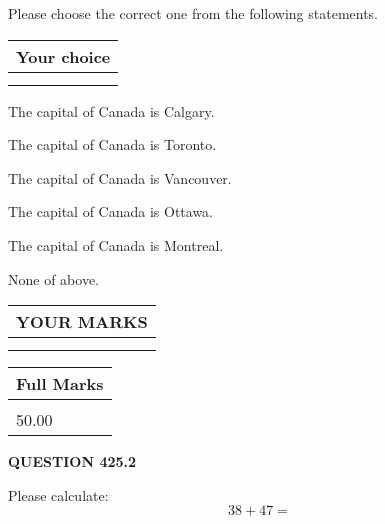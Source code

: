 \documentclass[12pt]{article}
\begin{document}
  
Please choose the correct one from the following statements.
  
  
\noindent\hspace{3.0in} \begin{tabular}{|l|}
\hline
Your choice \\
\hline
 \\ 
 \\ 
\hline
\end{tabular}
  
  
 
 
The capital of Canada is Calgary.
 
 
The capital of Canada is Toronto.
 
 
The capital of Canada is Vancouver.
 
 
The capital of Canada is Ottawa.
 
 
The capital of Canada is Montreal.
 
 
 None of above.
 
 
  
\vspace{0.2in}
  
\noindent\begin{tabular}{|l|}
\hline
 YOUR MARKS  \\
\hline
 \\ 
 \\ 
\hline
\end{tabular}
\hspace{0.05in} \begin{tabular}{|l|}
\hline
 Full Marks  \\
\hline
 \\ 
50.00 \\
\hline
\end{tabular}
{\textbf{\Large{QUESTION
425.2 
}}}
  
  
 
Please calculate:
\begin{equation}
38 +  %
47 = \nonumber
\end{equation}
 

 

 
   
   
 \vspace{0.2in}
 
   
   
   
   
\end{document}

